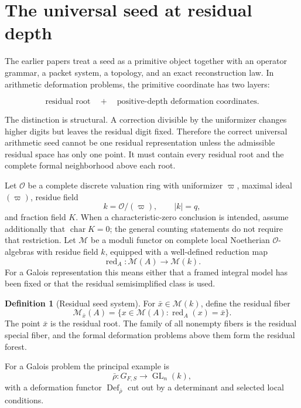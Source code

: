 \documentclass[11pt]{article}
\theoremstyle{definition}
\newtheorem{definition}[theorem]{Definition}
\theoremstyle{remark}
\newcommand{\Ocal}{\mathcal O}
\newcommand{\GL}{\operatorname{GL}}
\newcommand{\red}{\operatorname{red}}
\newcommand{\Def}{\operatorname{Def}}
\begin{document}
\tableofcontents
\newpage

\section{The universal seed at residual depth}

The earlier papers treat a seed as a primitive object together with an operator grammar, a packet system, a topology, and an exact reconstruction law.  In arithmetic deformation problems, the primitive coordinate has two layers:

\[
\boxed{
\text{residual root}
\quad+\quad
\text{positive-depth deformation coordinates}.
}
\]

The distinction is structural.  A correction divisible by the uniformizer changes higher digits but leaves the residual digit fixed.  Therefore the correct universal arithmetic seed cannot be one residual representation unless the admissible residual space has only one point.  It must contain every residual root and the complete formal neighborhood above each root.

Let \(\Ocal\) be a complete discrete valuation ring with uniformizer \(\varpi\), maximal ideal \((\varpi)\), residue field
\[
k=\Ocal/(\varpi),\qquad |k|=q,
\]
and fraction field \(K\).  When a characteristic-zero conclusion is intended, assume additionally that \(\operatorname{char}K=0\); the general counting statements do not require that restriction.  Let \(\mathcal M\) be a moduli functor on complete local Noetherian \(\Ocal\)-algebras with residue field \(k\), equipped with a well-defined reduction map
\[
\red_A:\mathcal M(A)\longrightarrow \mathcal M(k).
\]
For a Galois representation this means either that a framed integral model has been fixed or that the residual semisimplified class is used.

\begin{definition}[Residual seed system]
For \(\bar x\in\mathcal M(k)\), define the residual fiber
\[
\mathcal M_{\bar x}(A)
=
\{x\in\mathcal M(A):\red_A(x)=\bar x\}.
\]
The point \(\bar x\) is the residual root.  The family of all nonempty fibers is the residual special fiber, and the formal deformation problems above them form the residual forest.
\end{definition}

For a Galois problem the principal example is
\[
\bar\rho:G_{F,S}\longrightarrow \GL_n(k),
\]
with a deformation functor \(\Def_{\bar\rho}\) cut out by a determinant and selected local conditions.
\end{document}
